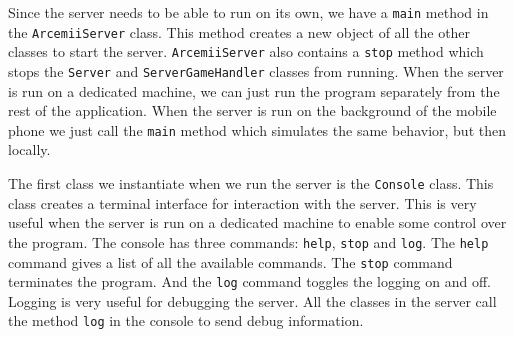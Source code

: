 \documentclass[../main.tex]{subfiles}
\begin{document}
		Since the server needs to be able to run on its own, we have a \texttt{main} method in the \texttt{ArcemiiServer} class. This method creates a new object of all the other classes to start the server. \texttt{ArcemiiServer} also contains a \texttt{stop} method which stops the \texttt{Server} and \texttt{ServerGameHandler} classes from running. When the server is run on a dedicated machine, we can just run the program separately from the rest of the application. When the server is run on the background of the mobile phone we just call the \texttt{main} method which simulates the same behavior, but then locally.

		The first class we instantiate when we run the server is the \texttt{Console} class. This class creates a terminal interface for interaction with the server. This is very useful when the server is run on a dedicated machine to enable some control over the program. The console has three commands: \texttt{help}, \texttt{stop} and \texttt{log}. The \texttt{help} command gives a list of all the available commands. The \texttt{stop} command terminates the program. And the \texttt{log} command toggles the logging on and off. Logging is very useful for debugging the server. All the classes in the server call the method \texttt{log} in the console to send debug information.
\end{document}
